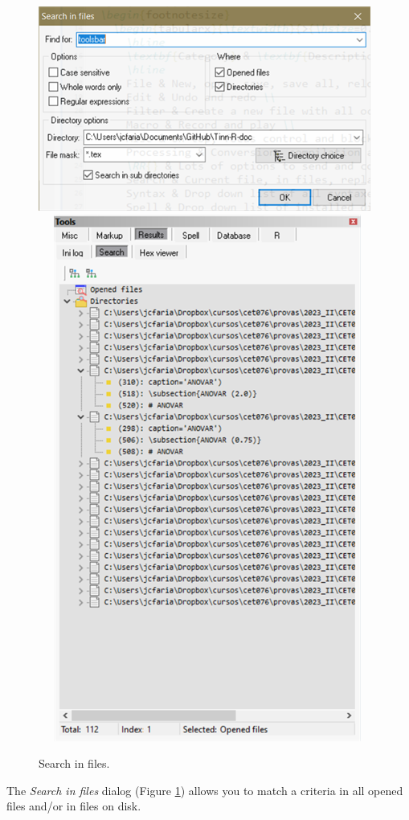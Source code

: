 \begin{figure}[H]
  \includegraphics[scale=0.35]{./res/dlg_search_in_files}~~
  \includegraphics[scale=0.35]{./res/tools_results_search.png}\\
  \caption{Search in files.}
  \label{fig:search_in_files}
\end{figure}
The \textit{Search in files} dialog
(Figure \ref{fig:search_in_files})
allows you to match a criteria in all opened files and/or in files on disk.


